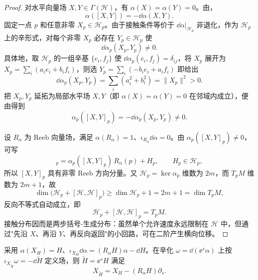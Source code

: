 \begin{proof}
对水平向量场 $X,Y\in\Gamma(\mathcal H)$，有 $\alpha(X)=\alpha(Y)=0$。由，
\begin{equation}
\alpha([X,Y])=-\dd\alpha(X,Y).
\label{eq:math-dg-contact-bracket-vertical}
\end{equation}
固定一点 $p$ 和任意非零 $X_p\in\mathcal H_p$。由于接触条件等价于 $\dd\alpha|_{\mathcal H_p}$ 非退化，作为 $\mathcal H_p$ 上的辛形式，对每个非零 $X_p$ 必存在 $Y_p\in\mathcal H_p$ 使
\begin{equation*}
\dd\alpha_p(X_p,Y_p)\neq0.
\end{equation*}
具体地，取 $\mathcal H_p$ 的一组辛基 $\{e_i,f_j\}$ 使 $\dd\alpha_p(e_i,f_j)=\delta_{ij}$，将 $X_p$ 展开为 $X_p=\sum_i(a_i e_i+b_i f_i)$，则选 $Y_p=\sum_i(-b_i e_i+a_i f_i)$ 即给出
\begin{equation*}
\dd\alpha_p(X_p,Y_p)=\sum_i(a_i^2+b_i^2)=\|X_p\|^2>0.
\end{equation*}
把 $X_p,Y_p$ 延拓为局部水平场 $X,Y$（即 $\alpha(X)=\alpha(Y)=0$ 在邻域内成立），便由得到
\begin{equation*}
\alpha_p([X,Y]_p)=-\dd\alpha_p(X_p,Y_p)\neq0.
\end{equation*}

设 $R_\alpha$ 为 Reeb 向量场，满足 $\alpha(R_\alpha)=1$、$\iota_{R_\alpha}\dd\alpha=0$。由 $\alpha_p([X,Y]_p)\neq0$，可写
\begin{equation*}
[X,Y]_p
=\alpha_p([X,Y]_p)\,R_\alpha(p)+H_p,
\qquad H_p\in\mathcal H_p,
\end{equation*}
所以 $[X,Y]_p$ 具有非零 Reeb 方向分量。又 $\mathcal H_p=\ker\alpha_p$ 维数为 $2m$，而 $T_pM$ 维数为 $2m+1$，故
\begin{equation*}
\dim\bigl(\mathcal H_p+[\mathcal H,\mathcal H]_p\bigr)
\ge\dim\mathcal H_p+1
=2m+1
=\dim T_pM,
\end{equation*}
反向不等式自动成立，即
\begin{equation}
\boxed{
\mathcal H_p+[\mathcal H,\mathcal H]_p=T_pM.
}
\label{eq:math-dg-contact-step-two-bracket-generating}
\end{equation}
接触分布因而是两步括号-生成分布：虽然单个允许速度永远限制在 $\mathcal H$ 中，但通过"先沿 $X$、再沿 $Y$、再反向返回"的小回路，可在二阶产生横向位移。
\end{proof}

\begin{proposition}
采用 $\alpha(X_H)=H$、$\iota_{X_H}\dd\alpha=(R_\alpha H)\alpha-\dd H$。在辛化 $\omega=\dd(\ee^s\alpha)$ 上按 $\iota_{X_{\widetilde H}}\omega=-\dd\widetilde H$ 定义场，则 $\widetilde H=\ee^sH$ 满足\[X_{\widetilde H}=X_H-(R_\alpha H)\partial_s.\]
\end{proposition}

